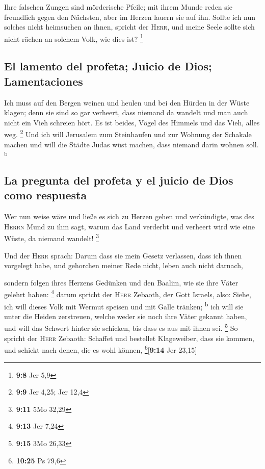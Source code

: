  Ihre falschen Zungen sind mörderische Pfeile; mit ihrem
Munde reden sie freundlich gegen den Nächsten, aber im Herzen lauern sie
auf ihn.  Sollte ich nun solches nicht heimsuchen an
ihnen, spricht der \textsc{Herr}, und meine Seele sollte sich nicht
rächen an solchem Volk, wie dies ist? \footnote{\textbf{9:8} Jer 5,9}

\hypertarget{el-lamento-del-profeta-juicio-de-dios-lamentaciones}{%
\subsection{El lamento del profeta; Juicio de Dios;
Lamentaciones}\label{el-lamento-del-profeta-juicio-de-dios-lamentaciones}}

 Ich muss auf den Bergen weinen und heulen und bei den
Hürden in der Wüste klagen; denn sie sind so gar verheert, dass niemand
da wandelt und man auch nicht ein Vieh schreien hört. Es ist beides,
Vögel des Himmels und das Vieh, alles weg. \footnote{\textbf{9:9} Jer
  4,25; Jer 12,4}  Und ich will Jerusalem zum Steinhaufen
und zur Wohnung der Schakale machen und will die Städte Judas wüst
machen, dass niemand darin wohnen soll. \textsuperscript{b}

\hypertarget{la-pregunta-del-profeta-y-el-juicio-de-dios-como-respuesta}{%
\subsection{La pregunta del profeta y el juicio de Dios como
respuesta}\label{la-pregunta-del-profeta-y-el-juicio-de-dios-como-respuesta}}

 Wer nun weise wäre und ließe es sich zu Herzen gehen und
verkündigte, was des \textsc{Herrn} Mund zu ihm sagt, warum das Land
verderbt und verheert wird wie eine Wüste, da niemand wandelt!
\footnote{\textbf{9:11} 5Mo 32,29}

 Und der \textsc{Herr} sprach: Darum dass sie mein Gesetz
verlassen, dass ich ihnen vorgelegt habe, und gehorchen meiner Rede
nicht, leben auch nicht darnach,

 sondern folgen ihres Herzens Gedünken und den Baalim,
wie sie ihre Väter gelehrt haben: \footnote{\textbf{9:13} Jer 7,24}
 darum spricht der \textsc{Herr} Zebaoth, der Gott
Israels, also: Siehe, ich will dieses Volk mit Wermut speisen und mit
Galle tränken; \textsuperscript{b}  ich will sie unter
die Heiden zerstreuen, welche weder sie noch ihre Väter gekannt haben,
und will das Schwert hinter sie schicken, bis dass es aus mit ihnen sei.
\footnote{\textbf{9:15} 3Mo 26,33}  So spricht der
\textsc{Herr} Zebaoth: Schaffet und bestellet Klageweiber, dass sie
kommen, und schickt nach denen, die es wohl können,
\footnote{\textbf{10:25} Ps 79,6}{[}\textbf{9:14} Jer 23,15{]}


